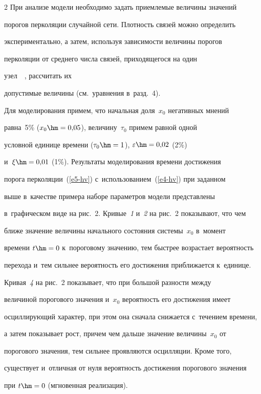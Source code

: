\begin{multicols}{2}
  При анализе модели необходимо задать приемлемые величины значений 


порогов перколяции случайной сети. Плотность связей можно определить 


экспериментально, а затем, используя зависимости величины порогов 


перколяции от среднего числа связей, приходящегося на один  


узел~~\cite{11-hv, 12-hv, 13-hv, 14-hv, 15-hv, 16-hv, 17-hv}, рассчитать их 


допустимые величины (см.\ уравнения в~разд.~4).


  


  Для моделирования примем, что начальная доля~$x_0$ негативных мнений 


равна~5\% ($x_0\hm=0{,}05$), величину~$\tau_0$ примем равной одной 


условной единице времени ($\tau_0\hm =1$), $\varepsilon\hm=0{,}02$ (2\%) 


и~$\xi\hm=0{,}01$ (1\%). Результаты моделирования времени достижения 


порога перколяции~(\ref{e5-hv}) с~использованием~(\ref{e4-hv}) при заданном 


выше в~качестве примера наборе параметров модели представлены 


в~графическом виде на рис.~2.  Кривые~\textit{1} и~\textit{2} на рис.~2 показывают, что чем 


ближе значение величины начального со\-сто\-яния сис\-те\-мы~$x_0$ в~момент 


времени $t\hm=0$ к~пороговому значению, тем быстрее возрастает вероятность 


перехода и~тем сильнее вероятность его достижения приближается к~единице. 


Кривая~\textit{4} на рис.~2 показывает, что при большой разности между 


величиной порогового значения и~$x_0$ вероятность его достижения имеет 


осциллирующий характер, при этом она сначала снижается с~течением времени, 


а затем показывает рост, причем чем дальше значение величины~$x_0$ от 


порогового значения, тем сильнее проявляются осцилляции. Кроме того, 


существует и~отличная от нуля вероятность достижения порогового значения 


при $t\hm=0$ (мгновенная реализация).



\end{multicols}
